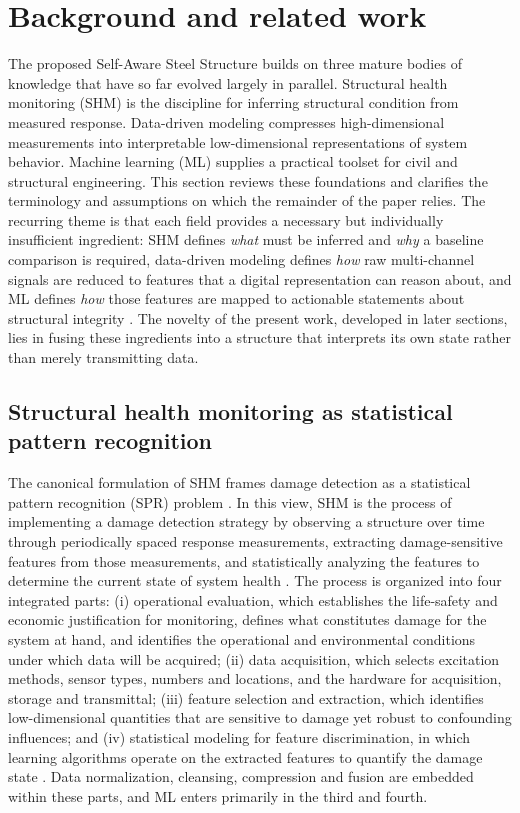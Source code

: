 \section{Background and related work}\label{sec:background}

The proposed Self-Aware Steel Structure builds on three mature bodies of knowledge that have so far evolved largely in parallel. Structural health monitoring (SHM) is the discipline for inferring structural condition from measured response. Data-driven modeling compresses high-dimensional measurements into interpretable low-dimensional representations of system behavior. Machine learning (ML) supplies a practical toolset for civil and structural engineering. This section reviews these foundations and clarifies the terminology and assumptions on which the remainder of the paper relies. The recurring theme is that each field provides a necessary but individually insufficient ingredient: SHM defines \textit{what} must be inferred and \textit{why} a baseline comparison is required, data-driven modeling defines \textit{how} raw multi-channel signals are reduced to features that a digital representation can reason about, and ML defines \textit{how} those features are mapped to actionable statements about structural integrity \citep{farrar2013shm,brunton2019data,naser2023ml}. The novelty of the present work, developed in later sections, lies in fusing these ingredients into a structure that interprets its own state rather than merely transmitting data.

\subsection{Structural health monitoring as statistical pattern recognition}\label{subsec:shm-spr}

The canonical formulation of SHM frames damage detection as a statistical pattern recognition (SPR) problem \citep{farrar2013shm}. In this view, SHM is the process of implementing a damage detection strategy by observing a structure over time through periodically spaced response measurements, extracting damage-sensitive features from those measurements, and statistically analyzing the features to determine the current state of system health \citep{farrar2007introduction}. The process is organized into four integrated parts: (i) operational evaluation, which establishes the life-safety and economic justification for monitoring, defines what constitutes damage for the system at hand, and identifies the operational and environmental conditions under which data will be acquired; (ii) data acquisition, which selects excitation methods, sensor types, numbers and locations, and the hardware for acquisition, storage and transmittal; (iii) feature selection and extraction, which identifies low-dimensional quantities that are sensitive to damage yet robust to confounding influences; and (iv) statistical modeling for feature discrimination, in which learning algorithms operate on the extracted features to quantify the damage state \citep{farrar2013shm}. Data normalization, cleansing, compression and fusion are embedded within these parts, and ML enters primarily in the third and fourth.

